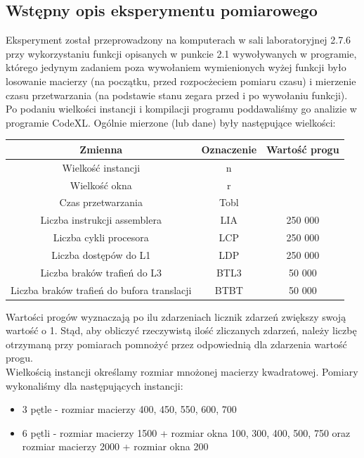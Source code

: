 \documentclass[10pt,a4paper]{article}
\begin{document}
\subsection{Wstępny opis eksperymentu pomiarowego}
Eksperyment został przeprowadzony na komputerach w sali laboratoryjnej 2.7.6 przy
wykorzystaniu funkcji opisanych w punkcie 2.1 wywoływanych w programie, którego jedynym
zadaniem poza wywołaniem wymienionych wyżej funkcji było losowanie macierzy
(na początku, przed rozpocżeciem pomiaru czasu) i mierzenie czasu przetwarzania
(na podstawie stanu zegara przed i po wywołaniu funkcji). Po podaniu wielkości instancji
i kompilacji programu poddawaliśmy go analizie w programie CodeXL. Ogólnie mierzone (lub dane)
były następujące wielkości:
\begin{center}
	\begin{tabular}{ |c|c|c| }
		\hline
		Zmienna                                    & Oznaczenie & Wartość progu \\
		\hline
		Wielkość instancji                         & n          &               \\
		Wielkość okna                              & r          &               \\
		Czas przetwarzania                         & Tobl       &               \\
		Liczba instrukcji assemblera               & LIA        & 250 000       \\
		Liczba cykli procesora                     & LCP        & 250 000       \\
		Liczba dostępów do L1                      & LDP        & 250 000       \\
		Liczba braków trafień do L3                & BTL3       & 50 000        \\
		Liczba braków trafień do bufora translacji & BTBT       & 50 000        \\
		\hline
	\end{tabular}
\end{center}
Wartości progów wyznaczają po ilu zdarzeniach licznik zdarzeń zwiększy swoją wartość o 1. Stąd, aby obliczyć rzeczywistą
ilość zliczanych zdarzeń, należy liczbę otrzymaną przy pomiarach pomnożyć przez odpowiednią dla zdarzenia wartość progu.\\

Wielkością instancji określamy rozmiar mnożonej macierzy kwadratowej.
Pomiary wykonaliśmy dla następujących instancji:
\begin{itemize}
	\item 3 pętle - rozmiar macierzy 400, 450, 550, 600, 700
	\item 6 pętli - rozmiar macierzy 1500 + rozmiar okna 100, 300, 400, 500, 750 oraz \\rozmiar macierzy 2000 + rozmiar okna 200
\end{itemize}
\end{document}
